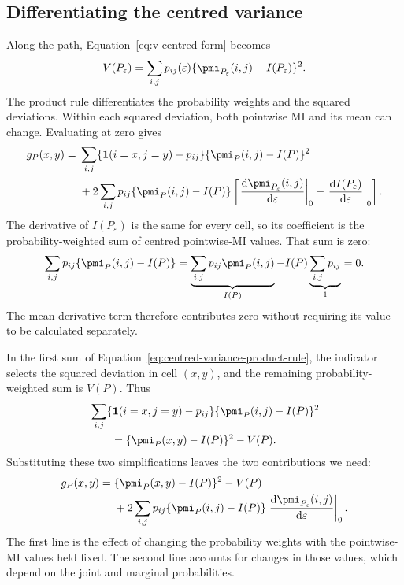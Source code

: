 \subsection{Differentiating the centred variance}

Along the path, Equation~\eqref{eq:v-centred-form} becomes
\begin{equation*}
  V(P_\varepsilon)
  =\sum_{i,j}p_{ij}(\varepsilon)
    \{\pmi_{P_\varepsilon}(i,j)-I(P_\varepsilon)\}^2.
\end{equation*}
The product rule differentiates the probability weights and the squared
deviations. Within each squared deviation, both pointwise MI and its
mean can change. Evaluating at zero gives
\begin{align}
  g_P(x,y)
  ={}&\sum_{i,j}\{\mathbf 1(i=x,j=y)-p_{ij}\}
      \{\pmi_P(i,j)-I(P)\}^2\notag\\
  &+2\sum_{i,j}p_{ij}\{\pmi_P(i,j)-I(P)\}
    \left[
      \left.\frac{\mathrm d\pmi_{P_\varepsilon}(i,j)}
                       {\mathrm d\varepsilon}\right|_0
      -\left.\frac{\mathrm d I(P_\varepsilon)}
                       {\mathrm d\varepsilon}\right|_0
    \right].
  \label{eq:centred-variance-product-rule}
\end{align}
The derivative of \(I(P_\varepsilon)\) is the same for every cell,
so its coefficient is the probability-weighted sum of centred
pointwise-MI values. That sum is zero:
\begin{equation*}
  \sum_{i,j}p_{ij}\{\pmi_P(i,j)-I(P)\}
  =\underbrace{\sum_{i,j}p_{ij}\pmi_P(i,j)}_{I(P)}
   -I(P)\underbrace{\sum_{i,j}p_{ij}}_1=0.
\end{equation*}
The mean-derivative term therefore contributes zero without requiring
its value to be calculated separately.

In the first sum of Equation~\eqref{eq:centred-variance-product-rule},
the indicator selects the squared deviation in cell \((x,y)\), and
the remaining probability-weighted sum is \(V(P)\). Thus
\begin{align*}
  &\sum_{i,j}\{\mathbf 1(i=x,j=y)-p_{ij}\}
      \{\pmi_P(i,j)-I(P)\}^2\\
  &\qquad=\{\pmi_P(x,y)-I(P)\}^2-V(P).
\end{align*}
Substituting these two simplifications leaves the two contributions
we need:
\begin{align}
  g_P(x,y)
  ={}&\{\pmi_P(x,y)-I(P)\}^2-V(P)\notag\\
  &+2\sum_{i,j}p_{ij}\{\pmi_P(i,j)-I(P)\}
    \left.\frac{\mathrm d\pmi_{P_\varepsilon}(i,j)}
                     {\mathrm d\varepsilon}\right|_0.
  \label{eq:g-direct-decomposition}
\end{align}
The first line is the effect of changing the probability weights with
the pointwise-MI values held fixed. The second line accounts for changes
in those values, which depend on the joint and marginal probabilities.

